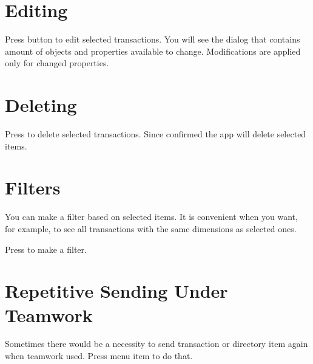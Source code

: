 \documentclass[a4paper,10pt,english]{sphinxmanual}
\begin{document}
\section{Editing}
\label{\detokenize{bulk-actions:editing}}
\sphinxAtStartPar
Press  button to edit selected transactions. You will see the dialog that
contains amount of objects and properties available to change. Modifications are applied
only for changed properties.

\noindent{}
\noindent{}


\section{Deleting}
\label{\detokenize{bulk-actions:deleting}}
\sphinxAtStartPar
Press  to delete selected transactions. Since confirmed the app will delete
selected items.

\noindent{}
\noindent{}


\section{Filters}
\label{\detokenize{bulk-actions:filters}}
\sphinxAtStartPar
You can make a filter based on selected items. It is convenient when you want, for example,
to see all transactions with the same dimensions as selected ones.

\sphinxAtStartPar
Press  to make a filter.

\noindent{}
\noindent{}


\section{Repetitive Sending Under Teamwork}
\label{\detokenize{bulk-actions:repetitive-sending-under-teamwork}}
\sphinxAtStartPar
Sometimes there would be a necessity to send transaction or directory item again when teamwork used.
Press  menu item to do that.
\end{document}
